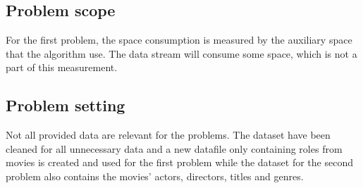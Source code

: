 \subsection{Problem scope}
For the first problem, the space consumption is measured by the auxiliary space that the algorithm use. The data stream will consume some space, which is not a part of this measurement.

\subsection{Problem setting}
Not all provided data are relevant for the problems. The dataset have been cleaned for all unnecessary data and a new datafile only containing roles from movies is created and used for the first problem while the dataset for the second problem also contains the movies' actors, directors, titles and genres.
